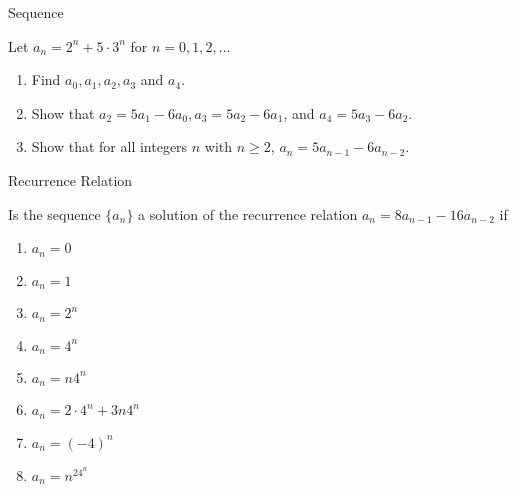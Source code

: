 \documentclass{beamer}
\begin{document}
\begin{frame}[t]{Sequence}
    \begin{example}
        Let $a_n = 2^n + 5 \cdot 3^n$ for $n = 0, 1, 2, \dots$
        \begin{enumerate}
            \item Find $a_0, a_1, a_2, a_3$ and $a_4$.
            \item Show that $a_2 = 5a_1 - 6a_0, a_3 = 5a_2 - 6a_1$, and $a_4 = 5a_3 - 6a_2$.
            \item Show that for all integers $n$ with $n \geq 2$, $a_n = 5a_{n-1}-6a_{n-2}$.
        \end{enumerate}
    \end{example}
\end{frame}

\begin{frame}{Recurrence Relation}
    \begin{example}
        Is the sequence $\{a_n\}$ a solution of the recurrence relation $a_n = 8a_{n-1} - 16a_{n-2}$ if \begin{enumerate}
            \item $a_n = 0$
            \item $a_n = 1$
            \item $a_n = 2^n$
            \item $a_n = 4^n$
            \item $a_n = n4^n$
            \item $a_n = 2 \cdot 4^n + 3n4^n$
            \item $a_n = (-4)^n$
            \item $a_n = n^24^n$
        \end{enumerate}
    \end{example}
\end{frame}
\end{document}
